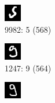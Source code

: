 \documentclass[a4paper,12pt,ngerman,oneside]{scrreprt}	%
\begin{document}
		\begin{figure}[h]
			\vspace{0.0cm} \centering
			\begin{subfigure}[t]{.19\linewidth}
				\centering
				\includegraphics[height=0.6\linewidth]{top5CNN/5-9982.png}
				\caption{9982: 5 (568)}
			\end{subfigure}
			\begin{subfigure}[t]{.19\linewidth}
				\centering
				\includegraphics[height=0.6\linewidth]{top5CNN/9-1247.png}
				\caption{1247: 9 (564)}
			\end{subfigure}
			\begin{subfigure}[t]{.19\linewidth}
				\centering
				\includegraphics[height=0.6\linewidth]{top5CNN/9-3597.png}

\end{subfigure}
\end{figure}
\end{document}
